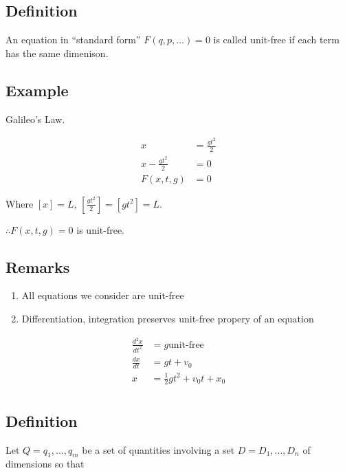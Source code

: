 \documentclass[12pt]{article}
\begin{document}
\subsection{Definition}
An equation in ``standard form'' $F(q, p, \ldots) = 0$ is called unit-free if
each term has the same dimenison.

\subsection{Example}
Galileo's Law.

\begin{equation}
  \begin{aligned}
    x &= \frac{gt^2}{2} \\
    x - \frac{gt^2}{2} &= 0 \\
    F(x,t,g) &= 0
  \end{aligned}
\end{equation}

Where $[x] = L$, $[\frac{gt^2}{2}] = [gt^2] = L$.

$\therefore F(x,t,g)=0$ is unit-free.

\subsection{Remarks}
\begin{enumerate}
\item All equations we consider are unit-free
\item Differentiation, integration preserves unit-free propery of an equation
\end{enumerate}

\begin{equation}
  \begin{aligned}
    \frac{d^2x}{dt^2} &= g \text{unit-free} \\
    \frac{dx}{dt} &= gt + v_0 \\
    x &= \frac{1}{2}gt^2 + v_0 t + x_0 \\
  \end{aligned}
\end{equation}

\subsection{Definition}
Let $Q = {q_1, ..., q_m}$ be a set of quantities involving a set $D =
{D_1,...,D_n}$ of dimensions so that
\end{document}

